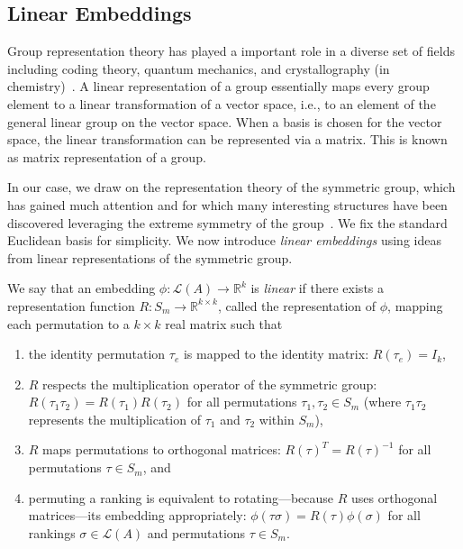 \documentclass[prodmode,acmec]{ec-acmsmall}
\newcommand{\calL}{{\mathcal{L}}}
\newcommand{\rank}{{\calL(A)}}
\begin{document}
\subsection{Linear Embeddings}
\label{sec:linear}

Group representation theory has played a important role in a diverse set of fields including %
coding theory, quantum mechanics, and crystallography (in chemistry)~\cite{BR86,KHS93,MS77}. A linear representation of a group essentially maps every group element to a linear transformation of a vector space, i.e., to an element of the general linear group on the vector space. When a basis is chosen for the vector space, the linear transformation can be represented via a matrix. This is known as matrix representation of a group. 

In our case, we draw on the representation theory of the symmetric group, which has gained much attention and for which many interesting structures have been discovered leveraging the extreme symmetry of the group~\cite{JKCR84}. We fix the standard Euclidean basis for simplicity. We now introduce \emph{linear embeddings} using ideas from linear representations of the symmetric group. 


\begin{definition}
We say that an embedding $\phi:\rank \rightarrow \mathbb{R}^k$ is \emph{linear} if there exists a representation function $R : S_m \rightarrow \mathbb{R}^{k \times k}$, called the representation of $\phi$, mapping each permutation to a $k \times k$ real matrix such that 
\begin{enumerate}
\item the identity permutation $\tau_e$ is mapped to the identity matrix: $R(\tau_e) = I_k$,
\item $R$ respects the multiplication operator of the symmetric group: $R(\tau_1 \tau_2) = R(\tau_1) R(\tau_2)$ for all permutations $\tau_1,\tau_2 \in S_m$ (where $\tau_1 \tau_2$ represents the multiplication of $\tau_1$ and $\tau_2$ within $S_m$), 
\item $R$ maps permutations to orthogonal matrices: $R(\tau)^T = R(\tau)^{-1}$ for all permutations $\tau \in S_m$, and
\item permuting a ranking is equivalent to rotating---because $R$ uses orthogonal matrices---its embedding appropriately: $\phi(\tau \sigma) = R(\tau) \phi(\sigma)$ for all rankings $\sigma \in \rank$ and permutations $\tau \in S_m$.
\end{enumerate}
\end{definition}
\end{document}
